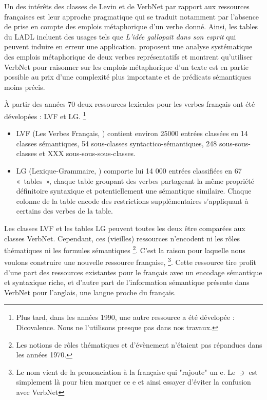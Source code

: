 Un des intérêts des classes de Levin et de VerbNet par rapport aux ressources
françaises est leur approche pragmatique qui se traduit notamment par l'absence
de prise en compte des emplois métaphorique d'un verbe donné. Ainsi, les tables
du LADL incluent des usages tels que \textit{L'idée gallopait dans son esprit}
qui peuvent induire en erreur une application. \cite{brown2012semantic}
proposent une analyse systématique des emplois métaphorique de deux verbes
représentatifs et montrent qu'utiliser VerbNet pour raisonner sur les emplois
métaphorique d'un texte est en partie possible au prix d'une complexité plus
importante et de prédicats sémantiques moins précis.

À partir des années 70 deux ressources lexicales pour les verbes français ont
été dévelopées : LVF et LG. \footnote{Plus tard, dans les années 1990, une
autre ressource a été dévelopée : Dicovalence. Nous ne l'utilisons presque pas
dans nos travaux.}

\begin{itemize}

    \item LVF (Les Verbes Français, \cite{dubois1997verbes}) contient environ
        25000 entrées classées en 14 classes sémantiques, 54 sous-classes
        syntactico-sémantiques, 248 sous-sous-classes et XXX
        sous-sous-sous-classes.

    \item LG (Lexique-Grammaire, \cite{gross1975methodes,boons1976structure})
        comporte lui 14 000 entrées classifiées en 67 «~tables~», chaque table
        groupant des verbes partageant la même propriété définitoire syntaxique
        et potentiellement une sémantique similaire. Chaque colonne de la table
        encode des restrictions supplémentaires s'appliquant à certains des
        verbes de la table.


\end{itemize}

Les classes LVF et les tables LG peuvent toutes les deux être comparées aux
classes VerbNet. Cependant, ces (vieilles) ressources n'encodent ni les rôles
thématiques ni les formules sémantiques \footnote{Les notions de rôles
thématiques et d'évènement n'étaient pas répandues dans les années 1970.}.
C'est la raison pour laquelle nous voulons construire une nouvelle ressource
française, \verbenet{}\footnote{Le nom vient de la prononciation à la française
qui "rajoute" un e. Le $\ni$ est simplement là pour bien marquer ce e et ainsi
essayer d'éviter la confusion avec VerbNet}. Cette ressource tire profit d'une
part des ressources existantes pour le français avec un encodage sémantique et
syntaxique riche, et d'autre part de l'information sémantique présente dans
VerbNet pour l'anglais, une langue proche du français.

